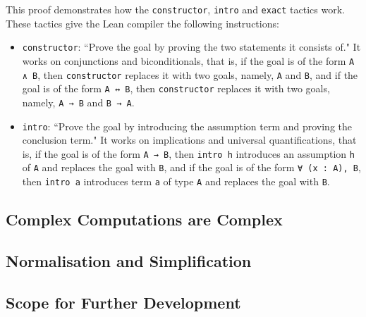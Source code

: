This proof demonstrates how the \lstinline|constructor|, \lstinline|intro| and \lstinline|exact| tactics work. These tactics give the Lean compiler the following instructions:
\begin{itemize}
    \item \lstinline|constructor|: ``Prove the goal by proving the two statements it consists of." It works on conjunctions and biconditionals, that is, if the goal is of the form \lstinline|A ∧ B|, then \lstinline|constructor| replaces it with two goals, namely, \lstinline|A| and \lstinline|B|, and if the goal is of the form \lstinline|A ↔ B|, then \lstinline|constructor| replaces it with two goals, namely, \lstinline|A → B| and \lstinline|B → A|.
    
    \item \lstinline|intro|: ``Prove the goal by introducing the assumption term and proving the conclusion term." It works on implications and universal quantifications, that is, if the goal is of the form \lstinline|A → B|, then \lstinline|intro h| introduces an assumption \lstinline|h| of \lstinline|A| and replaces the goal with \lstinline|B|, and if the goal is of the form \lstinline|∀ (x : A), B|, then \lstinline|intro a| introduces term \lstinline|a| of type \lstinline|A| and replaces the goal with \lstinline|B|.
\end{itemize}

\subsection{Complex Computations are Complex}

\subsection{Normalisation and Simplification}

\subsection{Scope for Further Development}